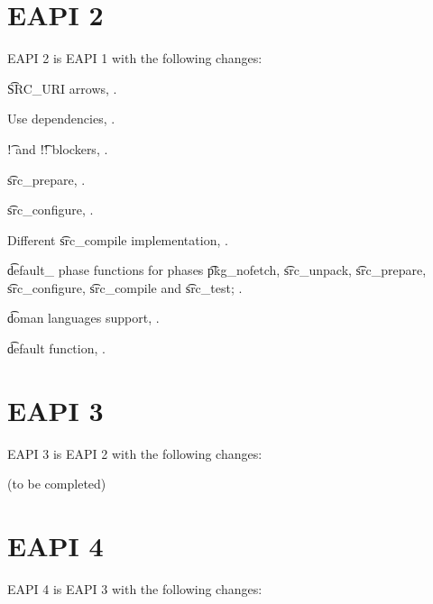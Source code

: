 \section*{EAPI 2}

EAPI 2 is EAPI 1 with the following changes:

\begin{compactitem}
\item \t{SRC\_URI} arrows, .
\item Use dependencies, .
\item \t{!} and \t{!!} blockers, .
\item \t{src\_prepare}, .
\item \t{src\_configure}, .
\item Different \t{src\_compile} implementation, .
\item \t{default\_} phase functions for phases \t{pkg\_nofetch}, \t{src\_unpack}, \t{src\_prepare},
    \t{src\_configure}, \t{src\_compile} and \t{src\_test}; .
\item \t{doman} languages support, .
\item \t{default} function, .
\end{compactitem}

\section*{EAPI 3}

EAPI 3 is EAPI 2 with the following changes:
\begin{compactitem}
\item (to be completed)
\end{compactitem}

\section*{EAPI 4}

EAPI 4 is EAPI 3 with the following changes:

